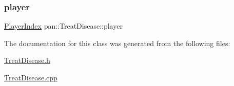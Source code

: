 \mbox{\label{classpan_1_1_treat_disease_a03aa74052746dc12d607458b260281db}} 
\subsubsection{\texorpdfstring{player}{player}}
{\footnotesize\ttfamily \hyperlink{namespacepan_a0cdabf874fbf1bb3a1f0152d108c2909}{Player\+Index} pan\+::\+Treat\+Disease\+::player}



The documentation for this class was generated from the following files\+:\begin{DoxyCompactItemize}
\item 
\hyperlink{_treat_disease_8h}{Treat\+Disease.\+h}\item 
\hyperlink{_treat_disease_8cpp}{Treat\+Disease.\+cpp}\end{DoxyCompactItemize}
